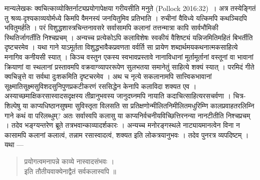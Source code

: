{\dev मान्यलेखकः क्वचित्काव्योक्तिर्नाट्यप्रयोगापेक्षया गरीयसीति मनुते} (Pollock 2016:32)~{\dev । अत्र तस्येङ्गितं तु श्रव्य-दृश्यकाव्ययोर्मध्ये किमपि वैमनस्यं जनयितुमिव प्रतिभाति । रुचीनां वैविध्ये यत्किमपि कथञ्चिदपि भवितुमर्हति । परं विशुद्धशास्त्रचिन्तनावसरे सर्वासामपि कलानां तत्तन्मात्रा कापि सार्वभौमिकी स्थितिर्जागर्तीति निश्चप्रचम् । अन्यच्च प्रत्येकोऽपि कलाविशेषः स्वकीयं वैशिष्ट्यं यन्निजमितिमहितं बिभर्तीति दृष्टचरमेव । यथा गाने याऽमूर्तता  विशुद्धभावैकप्रवणता वर्वर्ति सा प्रायेण शब्दार्थमयकथनात्मकसाहित्ये मनागिव कनीयसी स्यात् । किञ्च वस्तुन एकस्य स्वभावप्रस्तावे नानाविधानां मूर्तामूर्तानां वस्तूनां वा भावानां क्रियाणां वा स्थलानां प्रस्तावमपि वक्रवाग्व्यापररूपेण सुलभतया समानेतुं साहित्ये शक्यं स्यात् । परमिदं गीते क्वचिन्नृत्ते वा सर्वथा दुःशकमिति दृष्टचरमेव । अथ च नृत्ये सकलानामपि सात्त्विकभावानां सूक्ष्मातिसूक्ष्मसुविशदसुनिपुणप्रकटीकरणं रससिद्धेन केनापि कलाविदा शक्यत एव । अस्याच्छमाक्षिकरसास्वादसदृक्षस्य तीव्रानुभवस्य जानुदघ्नमपि नायाति कदाचित्साहित्यरसचर्वणा । चित्र-शिल्पेषु या काप्यधिष्ठानसुषमा सुविस्तृता विलसति सा प्रतिक्षणोन्मीलितनिमीलितमधुरिम्णि कालप्रवाहतरलिम्नि गाने कथं वा परिलब्धुम्? अतः सर्वास्वपि कलासु या काप्यनिर्वचनीयविच्छित्तिरनन्या नानटीतीति निश्चप्रचम् । तदेव भङ्ग्यन्तरेण ब्रूते तत्रभवान्काव्यादर्शकारः । अन्यच्च मनोरङ्गस्थले नाट्यायमानत्वेन विना न कासामपि कलानां कलात्वं, तन्नाम रसास्वादत्वं, शक्यत इति लोकत्रयानुभवः । तदेव पुनरत्र व्यपदिष्टम् । यथा ---} 
\begin{quote}
{\dev प्रयोगत्वमनापन्ने काव्ये नास्वादसंभवः ।}\\
{\dev इति तौतीयवाक्येनाद्वैतं सर्वकलास्वपि ॥}
\end{quote}


